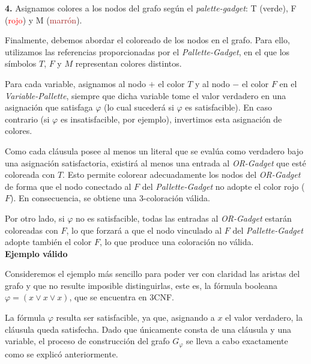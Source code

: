 \documentclass[a4paper,12pt]{article}
\begin{document}
\begin{itemize}
\begin{center}
\begin{tikzpicture}[
  every node/.style={circle, draw, minimum size=1cm, font=\small},
  identmas/.style={thick, draw=green!70!black},
  identmenos/.style={thick, draw=red}
]
\end{tikzpicture}
\end{center}
\textbf{4.} Asignamos colores a los nodos del grafo según el \textit{palette-gadget}: T (\textcolor{green!50!black}{verde}), F (\textcolor{red}{rojo}) y M (\textcolor{brown}{marrón}).

Finalmente, debemos abordar el coloreado de los nodos en el grafo. Para ello, utilizamos las referencias proporcionadas por el \textit{Pallette-Gadget}, en el que los símbolos $T$, $F$ y $M$ representan colores distintos. 

Para cada variable, asignamos al nodo $+$ el color $T$ y al nodo $-$ el color $F$ en el \textit{Variable-Pallette}, siempre que dicha variable tome el valor verdadero en una asignación que satisfaga $\varphi$ (lo cual sucederá si $\varphi$ es satisfacible). En caso contrario (si $\varphi$ es insatisfacible, por ejemplo), invertimos esta asignación de colores.

Como cada cláusula posee al menos un literal que se evalúa como verdadero bajo una asignación satisfactoria, existirá al menos una entrada al \textit{OR-Gadget} que esté coloreada con $T$. Esto permite colorear adecuadamente los nodos del \textit{OR-Gadget} de forma que el nodo conectado al $F$ del \textit{Pallette-Gadget} no adopte el color rojo ($F$). En consecuencia, se obtiene una 3-coloración válida.

Por otro lado, si $\varphi$ no es satisfacible, todas las entradas al \textit{OR-Gadget} estarán coloreadas con $F$, lo que forzará a que el nodo vinculado al $F$ del \textit{Pallette-Gadget} adopte también el color $F$, lo que produce una coloración no válida.\\



\textbf{Ejemplo válido}

Consideremos el ejemplo más sencillo para poder ver con claridad las aristas del grafo y que no resulte imposible distinguirlas, este es, la fórmula booleana $\varphi = (x \lor x \lor x)$, que se encuentra en 3CNF.

La fórmula $\varphi$ resulta ser satisfacible, ya que, asignando a $x$ el valor verdadero, la cláusula queda satisfecha. Dado que únicamente consta de una cláusula y una variable, el proceso de construcción del grafo $G_\varphi$ se lleva a cabo exactamente como se explicó anteriormente.


\begin{center}
\begin{tikzpicture}[
  every node/.style={circle, draw, minimum size=1cm, font=\small},
  identmas/.style={thick, draw=black!70!black},
  identmenos/.style={thick, draw=black}
]


\end{tikzpicture}
\end{center}
\end{itemize}
\end{document}
